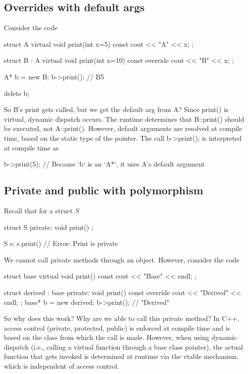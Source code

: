 \documentclass{report}
\begin{document}
    \bigbreak \noindent 
    \subsection{Overrides with default args}
    \bigbreak \noindent 
    Consider the code
    \bigbreak \noindent 
    \begin{cppcode}
        struct A {
            virtual void print(int x=5) const {cout <<  "A" << x; }
        };

        struct B : A {
            virtual void print(int x=10) const override {cout << "B" << x;}
        };

        A* b = new B;
        b->print(); // B5

        delete b;
        \end{cppcode}
        \bigbreak \noindent 
        So B's print gets called, but we get the default arg from A?
        \bigbreak \noindent 
        Since print() is virtual, dynamic dispatch occurs. The runtime determines that B::print() should be executed, not A::print().
        \bigbreak \noindent 
        However, default arguments are resolved at compile time, based on the static type of the pointer.
        \bigbreak \noindent 
        The call b->print(); is interpreted at compile time as
        \bigbreak \noindent 
        \begin{cppcode}
        b->print(5); // Because `b` is an `A*`, it uses A's default argument
        \end{cppcode}

    \bigbreak \noindent 
    \subsection{Private and public with polymorphism}
    \bigbreak \noindent 
    Recall that for a struct $S$
    \bigbreak \noindent 
    \begin{cppcode}
        struct S {
        private: 
            void print() {}
        };

        S s;
        s.print() // Error: Print is private
    \end{cppcode}
    \bigbreak \noindent 
    We cannot call private methods through an object. However, consider the code
    \bigbreak \noindent 
    \begin{cppcode}
        struct base {
            virtual void print() const {cout << "Base" << endl;}
        };

        struct derived : base{
            private:
            void print() const override {cout << "Derived" << endl;}
        };
        base* b = new derived{};
        b->print(); // "Derived"
    \end{cppcode}
    \bigbreak \noindent 
    So why does this work? Why are we able to call this private method?
    \bigbreak \noindent 
    In C++, access control (private, protected, public) is enforced at compile time and is based on the class from which the call is made. However, when using dynamic dispatch (i.e., calling a virtual function through a base class pointer), the actual function that gets invoked is determined at runtime via the vtable mechanism, which is independent of access control.
\end{document}
